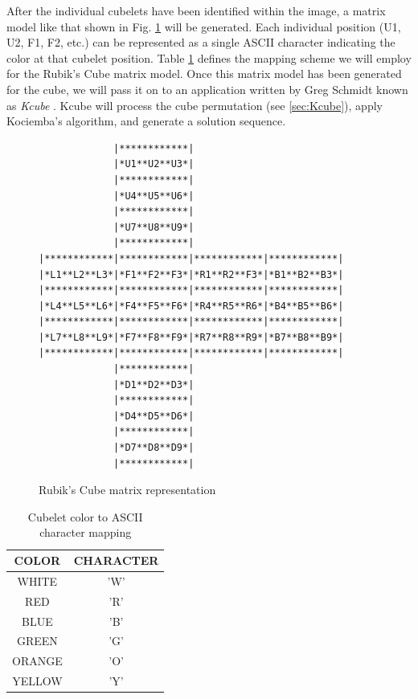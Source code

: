 \documentclass[final, letterpaper, 10 pt, conference, onecolumn]{IEEEtran}
\begin{document}
After the individual cubelets have been identified within the image, a matrix model like that shown in Fig. \ref{fig:matrix layout} will be generated. Each individual position (U1, U2, F1, F2, etc.) can be represented as a single ASCII character indicating the color at that cubelet position. Table \ref{table:cubelet representation} defines the mapping scheme we will employ for the Rubik's Cube matrix model. Once this matrix model has been generated for the cube, we will pass it on to an application written by Greg Schmidt known as \textit{Kcube} \cite{The Two-Phase Algorithm}. Kcube will process the cube permutation (see \ref{sec:Kcube}), apply Kociemba's algorithm, and generate a solution sequence.
\begin{figure}[!ht]
\begin{center}
\begin{BVerbatim}
             |************|
             |*U1**U2**U3*|
             |************|
             |*U4**U5**U6*|
             |************|
             |*U7**U8**U9*|
             |************|
|************|************|************|************|
|*L1**L2**L3*|*F1**F2**F3*|*R1**R2**F3*|*B1**B2**B3*|
|************|************|************|************|
|*L4**L5**L6*|*F4**F5**F6*|*R4**R5**R6*|*B4**B5**B6*|
|************|************|************|************|
|*L7**L8**L9*|*F7**F8**F9*|*R7**R8**R9*|*B7**B8**B9*|
|************|************|************|************|
             |************|
             |*D1**D2**D3*|
             |************|
             |*D4**D5**D6*|
             |************|
             |*D7**D8**D9*|
             |************|
\end{BVerbatim}
\end{center}
\caption{Rubik's Cube matrix representation}
\label{fig:matrix layout}
\end{figure}

\begin{table}[!ht]
\caption{Cubelet color to ASCII character mapping}
\label{table:cubelet representation}
\centering
\begin{tabular}{|c|c|}
\hline
\textbf{COLOR} & \textbf{CHARACTER} \\ \hline
WHITE          & 'W'              \\ \hline
RED            & 'R'              \\ \hline
BLUE           & 'B'              \\ \hline
GREEN          & 'G'              \\ \hline
ORANGE         & 'O'              \\ \hline
YELLOW         & 'Y'              \\ \hline
\end{tabular}
\end{table}
\end{document}
